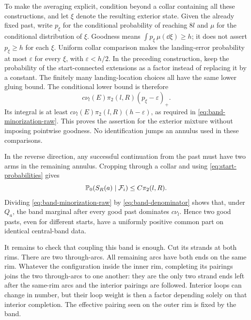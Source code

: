 To make the averaging explicit, condition beyond a collar
containing all these constructions, and let $\xi$ denote the
resulting exterior state.  Given the already fixed past, write
$p_\xi$ for the conditional probability of reaching $8l$ and
$\mu$ for the conditional distribution of $\xi$.  Goodness
means $\int p_\xi\,\mu(\dd\xi)\ge h$; it does not assert
$p_\xi\ge h$ for each $\xi$.  Uniform collar comparison makes
the landing-error probability at most $\varepsilon$ for every
$\xi$, with $\varepsilon<h/2$.  In the preceding construction,
keep the probability of the start-connected extensions as a
factor instead of replacing it by a constant.  The finitely
many landing-location choices all have the same lower gluing
bound.  The conditional lower bound is therefore
\[
 c\nu_l(E)\pi_2(l,R)(p_\xi-\varepsilon)_+.
\]
Its integral is at least
$c\nu_l(E)\pi_2(l,R)(h-\varepsilon)$, as required in
\eqref{eq:band-minorization-raw}.  This proves the assertion for
the exterior mixture without imposing pointwise goodness.
No identification jumps an annulus used in these comparisons.

In the reverse direction, any successful continuation from the
past must have two arms in the remaining annulus.  Cropping
through a collar and using \eqref{eq:start-probabilities} gives
\begin{equation}\label{eq:band-denominator}
 \mathbb P_0(S_R(a)\mid\mathcal F_i)\le C\pi_2(l,R).
\end{equation}
Dividing \eqref{eq:band-minorization-raw} by
\eqref{eq:band-denominator} shows that, under $Q_a$, the band
marginal after every good past dominates $c\nu_l$.  Hence two
good pasts, even for different starts, have a uniformly positive
common part on identical central-band data.

It remains to check that coupling this band is enough.  Cut its
strands at both rims.  There are two through-arcs.  All remaining
arcs have both ends on the same rim.  Whatever the configuration
inside the inner rim, completing its pairings joins the two
through-arcs to one another: they are the only two strand ends
left after the same-rim arcs and the interior pairings are
followed.  Interior loops can change in number, but their loop
weight is then a factor depending solely on that interior
completion.  The effective pairing seen on the outer rim is
fixed by the band.


